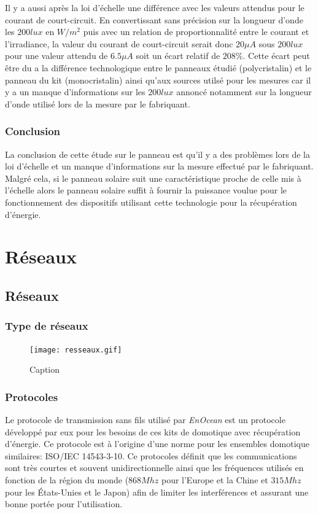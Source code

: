 \documentclass{rapportENS}
\begin{document}
 Il y a aussi après la loi d'échelle une différence avec les valeurs attendus pour le courant de court-circuit. En convertissant sans précision sur la longueur d'onde les $200lux$ en $W/m^2$ puis avec un relation de proportionnalité entre le courant et l'irradiance, la valeur du courant de court-circuit serait donc $20\mu A$ sous $200lux$ pour une valeur attendu de $6.5\mu A$  soit un écart relatif de $208\%$. Cette écart peut être du a la différence technologique entre le panneaux étudié (polycristalin) et  le panneau du kit (monocristalin) ainsi qu'aux sources utilsé pour les mesures car il y a un manque d'informations sur les $200lux$ annoncé notamment sur la longueur d'onde utilisé lors de la mesure par le fabriquant. 
 
 \subsubsection{Conclusion}
 La conclusion de cette étude sur le panneau est qu'il y a des problèmes lors de la loi d'échelle et un manque d'informations sur la mesure effectué par le fabriquant. Malgré cela, si le panneau solaire suit une caractéristique proche de celle mis à l'échelle alors le panneau solaire suffit à fournir la puissance voulue pour le fonctionnement des dispositifs utilisant cette technologie pour la récupération d'énergie.
 
 \section{Réseaux}
 \subsection{Réseaux}
 \subsubsection{Type de réseaux}
 \begin{figure}
     \centering
     \texttt{[image: resseaux.gif]}
     \caption{Caption}
     \label{fig:my_label}
 \end{figure}
 
 \subsubsection{Protocoles}
 Le protocole de transmission sans fils utilisé par \textit{EnOcean} est un protocole développé par eux pour les besoins de ces kits de domotique avec récupération d'énergie. Ce protocole est à l'origine d'une norme pour les ensembles domotique similaires: ISO/IEC 14543-3-10. Ce protocoles définit que les communications sont très courtes et souvent unidirectionnelle ainsi que les fréquences utilisés en fonction de la région du monde ($868 Mhz$ pour l'Europe et la Chine et $315Mhz$ pour les États-Unies et le Japon) afin de limiter les interférences et assurant une bonne portée pour l'utilisation.  
 
\end{document}

